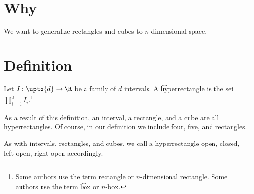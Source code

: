 

\section*{Why}

We want to generalize rectangles and cubes to $n$-dimensional space.

\section*{Definition}

Let $I: \upto{d} \to \R $ be a family of $d$ intervals.
A \t{hyperrectangle} is the set $\prod_{i=1}^{d} I_i$.\footnote{Some authors use the term rectangle or \t{$n$-dimensional rectangle}.
Some authors use the term \t{box} or \t{$n$-box}.}

As a result of this definition, an interval, a rectangle, and a cube are all hyperrectangles.
Of course, in our definition we include four, five, and  rectangles.

As with intervals, rectangles, and cubes, we call a hyperrectangle open, closed, left-open, right-open accordingly.

\blankpage